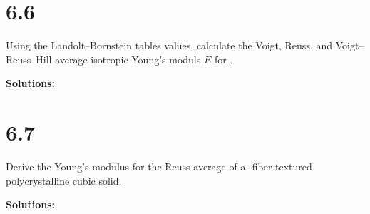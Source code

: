 \documentclass[12pt]{article}
\begin{document}
\section{6.6}
Using the Landolt--Bornstein tables values, calculate the Voigt, Reuss,
and Voigt--Reuss--Hill average isotropic Young's moduls $E$ for .

\textbf{Solutions:}


\section{6.7}
Derive the Young's modulus for the Reuss average of
a \hkl[111]-fiber-textured polycrystalline cubic solid.

\textbf{Solutions:}


% 
% 

\end{document}

